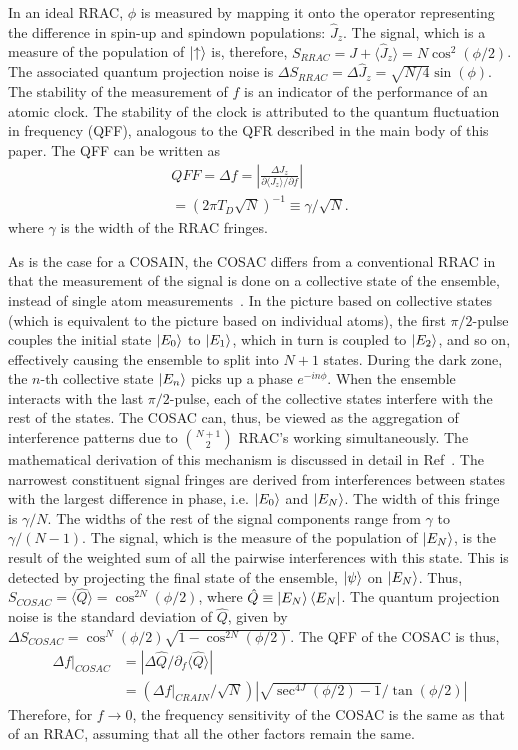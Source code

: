 \documentclass[aps,pra,letterpaper,superscriptaddress,showpacs,amsmath,floats,twocolumn]{revtex4-1}
\begin{document}
In an ideal RRAC, $\phi$ is measured by mapping it onto the operator representing the difference in spin-up and spindown populations: $\hat{J}_z$. The signal, which is a measure of the population of $\ket{\uparrow}$ is, therefore, $S_{RRAC}=J + \langle \hat{J}_z \rangle=N\cos^{2}(\phi/2)$. The associated quantum projection noise is $\Delta S_{RRAC}=\Delta \hat{J}_z=\sqrt{N/4}\sin(\phi)$. The stability of the measurement of $f$ is an indicator of the performance of an atomic clock. The stability of the clock is attributed to the quantum fluctuation in frequency (QFF), analogous to the QFR described in the main body of this paper. The QFF can be written as
\begin{align}
QFF=\Delta f=\left|\frac{\Delta J_z}{\partial \langle J_z \rangle/\partial f}\right| \nonumber\\
=\left(2\pi T_D\sqrt{N}\right)^{-1}\equiv\gamma/\sqrt{N}.
\end{align}
%
where $\gamma$ is the width of the RRAC fringes.

As is the case for a COSAIN, the COSAC differs from a conventional RRAC in that the measurement of the signal is done on a collective state of the ensemble, instead of single atom measurements~\cite{COSAC}. In the picture based on collective states (which is equivalent to the picture based on individual atoms), the first $\pi/2$-pulse couples the initial state $\ket{E_0}$ to $\ket{E_1}$, which in turn is coupled to $\ket{E_2}$, and so on, effectively causing the ensemble to split into $N+1$ states. During the dark zone, the $n$-th collective state $\ket{E_n}$ picks up a phase $e^{-in\phi}$. When the ensemble interacts with the last $\pi/2$-pulse, each of the collective states interfere with the rest of the states. The COSAC can, thus, be viewed as the aggregation of interference patterns due to ${N+1}\choose 2$ RRAC's working simultaneously. The mathematical derivation of this mechanism is discussed in detail in Ref~\cite{COSAC}. The narrowest constituent signal fringes are derived from interferences between states with the largest difference in phase, i.e. $\ket{E_0}$ and $\ket{E_N}$. The width of this fringe is $\gamma/N$. The widths of the rest of the signal components range from $\gamma$ to $\gamma/(N-1)$. The signal, which is the measure of the population of $\ket{E_N}$, is the result of the weighted sum of all the pairwise interferences with this state. This is detected by projecting the final state of the ensemble, $\ket{\psi}$ on $\ket{E_N}$. Thus, $S_{COSAC}=\langle\hat{Q}\rangle=\cos^{2N}(\phi/2)$, where $\hat{Q} \equiv\ket{E_N}\bra{E_N}$. The quantum projection noise is the standard deviation of $\hat{Q}$, given by $\Delta S_{COSAC}=\cos^{N}(\phi/2)\sqrt{1-\cos^{2N}(\phi/2)}$. The QFF of the COSAC is thus,
\begin{align}
\Delta f\bigr|_{COSAC} & = \left|\Delta \hat{Q}/\partial_{f} \langle \hat{Q}\rangle \right|\nonumber\\
& = (\Delta f\bigr|_{CRAIN}/\sqrt{N})|\sqrt{\sec^{4J}(\phi/2)-1}/\tan(\phi/2)|
\label{Eq: COSAC QFF}
\end{align}
Therefore, for $f \rightarrow 0$, the frequency sensitivity of the COSAC is the same as that of an RRAC, assuming that all the other factors remain the same. 
%
\end{document}
